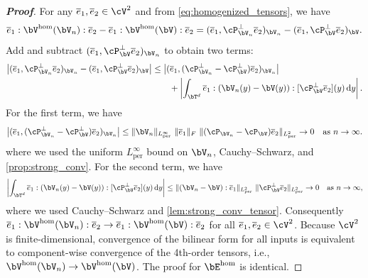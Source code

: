 \begin{proof}[\bf Proof]
    For any $\overline{e}_1,\overline{e}_2\in\cV^{2}$ and from \cref{eq:homogenized_tensors}, we have
\begin{equation*}
\overline{e}_1:\bV^{\mathrm{hom}}(\bV_n):\overline{e}_2 - \overline{e}_1:\bV^{\mathrm{hom}}(\bV):\overline{e}_2
=(\overline{e}_1,\cP_{\bV_n}^\perp \overline{e}_2)_{\bV_n}-(\overline{e}_1,\cP_{\bV}^\perp \overline{e}_2)_{\bV}.
\end{equation*}
Add and subtract $(\overline{e}_1,\cP_{\bV}^\perp \overline{e}_2)_{\bV_n}$ to obtain two terms:
\begin{equation}\label{eq:Vhom_two_terms}
\begin{aligned}
    \bigl|(\overline{e}_1,\cP_{\bV_n}^\perp \overline{e}_2)_{\bV_n}-(\overline{e}_1,\cP_{\bV}^\perp \overline{e}_2)_{\bV}\bigr|
&\leq
\bigl|(\overline{e}_1,(\cP_{\bV_n}^\perp-\cP_{\bV}^\perp)\overline{e}_2)_{\bV_n}\bigr|\\
&\qquad+
\left|\int_{\bT^d} \overline{e}_1:\left(\bV_n(y)-\bV(y)\right):[\cP_{\bV}^\perp \overline{e}_2](y)\, \mathrm{d} y\right|.
\end{aligned}
\end{equation}
For the first term, we have
\begin{equation*}
\bigl|(\overline{e}_1,(\cP_{\bV_n}^\perp-\cP_{\bV}^\perp)\overline{e}_2)_{\bV_n}\bigr|
\le
\|\bV_n\|_{L^\infty_{\rm per}}\ \|\overline{e}_1\|_F\ \|(\cP_{\bV_n}-\cP_{\bV})\overline{e}_2\|_{L^2_{\rm per}}
\to 0 \quad \text{as } n \to \infty.
\end{equation*}
where we used the uniform $L^\infty_{\mathrm{per}}$ bound on $\bV_n$, Cauchy--Schwarz, and \cref{prop:strong_conv}. For the second term, we have
\begin{equation*}
\left|\int_{\bT^d} \overline{e}_1:\left(\bV_n(y)-\bV(y)\right):[\cP_{\bV}^\perp \overline{e}_2](y)\, \mathrm{d} y\right|
\le
\|(\bV_n-\bV):\overline{e}_1\|_{L^2_{\rm per}}\ \|\cP_{\bV}^\perp \overline{e}_2\|_{L^2_{\rm per}}\to 0 \quad \text{as } n \to \infty,
\end{equation*}
where we used Cauchy--Schwarz and \cref{lem:strong_conv_tensor}.
Consequently $\overline{e}_1:\bV^{\mathrm{hom}}(\bV_n):\overline{e}_2\to \overline{e}_1:\bV^{\mathrm{hom}}(\bV):\overline{e}_2$ for all $\overline{e}_1,\overline{e}_2\in\cV^{2}$. Because $\cV^{2}$ is finite-dimensional, convergence of the bilinear form for all inputs is equivalent to component-wise convergence of the 4th-order tensors, i.e., $\bV^{\mathrm{hom}}(\bV_n)\to \bV^{\mathrm{hom}}(\bV)$. The proof for $\bE^{\mathrm{hom}}$ is identical.
\end{proof}

